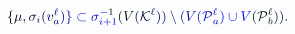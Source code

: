 \documentclass[12pt]{article}
\begin{document}
\makeatletter
\renewcommand*{\@textcolor}[3]{%
  \protect\leavevmode
  \begingroup
    \color#1{#2}#3%
  \endgroup
}
\makeatother
\begin{displaymath}
\mathcolor[RGB]{0,0,15}{\{} \mathcolor[RGB]{0,0,30}{\mu} \mathcolor[RGB]{0,0,45}{,} \mathcolor[RGB]{0,0,60}{\sigma} _ { \mathcolor[RGB]{0,0,75}{i} } \mathcolor[RGB]{0,0,90}{(} \mathcolor[RGB]{0,0,105}{v} _ { \mathcolor[RGB]{0,0,120}{a} } ^ { \mathcolor[RGB]{0,0,135}{\ell} } \mathcolor[RGB]{0,0,150}{)} \mathcolor[RGB]{0,0,165}{\}} \mathcolor[RGB]{0,0,180}{\subset} \mathcolor[RGB]{0,0,195}{\sigma} _ { \mathcolor[RGB]{0,0,210}{i} \mathcolor[RGB]{0,0,225}{+} \mathcolor[RGB]{0,0,240}{1} } ^ { \mathcolor[RGB]{0,0,255}{-} \mathcolor[RGB]{0,15,0}{1} } \mathcolor[RGB]{0,15,15}{(} \mathcolor[RGB]{0,15,30}{V} \mathcolor[RGB]{0,15,45}{(} \mathcal { \mathcolor[RGB]{0,15,60}{K} } ^ { \mathcolor[RGB]{0,15,75}{\ell} } \mathcolor[RGB]{0,15,90}{)} \mathcolor[RGB]{0,15,105}{)} \mathcolor[RGB]{0,15,120}{\setminus} \mathcolor[RGB]{0,15,135}{(} \mathcolor[RGB]{0,15,150}{V} \mathcolor[RGB]{0,15,165}{(} \mathcal { \mathcolor[RGB]{0,15,180}{P} } _ { \mathcolor[RGB]{0,15,195}{a} } ^ { \mathcolor[RGB]{0,15,210}{\ell} } \mathcolor[RGB]{0,15,225}{)} \mathcolor[RGB]{0,15,240}{\cup} \mathcolor[RGB]{0,15,255}{V} \mathcolor[RGB]{0,30,0}{(} \mathcal { \mathcolor[RGB]{0,30,15}{P} } _ { \mathcolor[RGB]{0,30,30}{b} } ^ { \mathcolor[RGB]{0,30,45}{\ell} } \mathcolor[RGB]{0,30,60}{)} \mathcolor[RGB]{0,30,75}{)} \mathcolor[RGB]{0,30,90}{.}
\end{displaymath}
\end{document}
